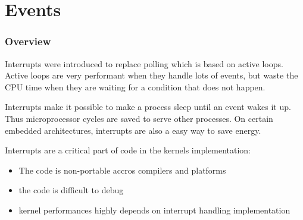\section{Events}

%
%
%

\begin{frame}
  \frametitle{Overview}

  Interrupts were introduced to replace polling which is based on active
  loops. Active loops are very performant when they handle lots of events, but
  waste the CPU time when they are waiting for a condition that does not
  happen.

  \nl

  Interrupts make it possible to make a process sleep until an event wakes it
  up. Thus microprocessor cycles are saved to serve other processes. On certain
  embedded architectures, interrupts are also a easy way to save energy.

  \nl

  Interrupts are a critical part of code in the kernels implementation:

  \begin{itemize}
    \item The code is non-portable accros compilers and platforms
    \item the code is difficult to debug
    \item kernel performances highly depends on interrupt handling implementation
  \end{itemize}

\end{frame}


%
%
%

